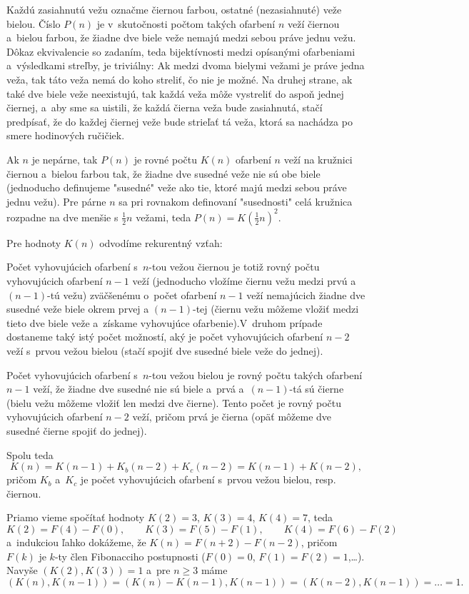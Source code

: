 {%
Každú zasiahnutú vežu označme čiernou farbou, ostatné (nezasiahnuté) veže bielou. Číslo $P(n)$
je v~skutočnosti počtom takých ofarbení $n$ veží čiernou a~bielou farbou, že žiadne dve biele veže nemajú medzi sebou práve jednu vežu. Dôkaz ekvivalencie so zadaním, teda bijektívnosti medzi opísanými ofarbeniami a~výsledkami streľby, je triviálny: Ak medzi dvoma bielymi vežami je práve jedna veža, tak táto veža nemá do koho streliť, čo nie je možné. Na druhej strane, ak také dve biele veže neexistujú, tak každá veža môže vystreliť do aspoň jednej čiernej, a~aby sme sa uistili, že každá čierna veža bude zasiahnutá, stačí predpísať, že do každej čiernej veže bude strieľať tá veža, ktorá sa nachádza po smere hodinových ručičiek.

Ak $n$ je nepárne, tak $P(n)$ je rovné počtu $K(n)$ ofarbení $n$ veží na kružnici čiernou a~bielou farbou tak, že žiadne dve susedné veže nie sú obe biele (jednoducho definujeme "susedné" veže ako tie, ktoré majú medzi sebou práve jednu vežu). Pre párne $n$ sa pri rovnakom definovaní "susednosti" celá kružnica rozpadne na dve menšie s $\frac12n$ vežami, teda $P(n)=K(\frac12n)^2$.

Pre hodnoty $K(n)$ odvodíme rekurentný vzťah:

Počet vyhovujúcich ofarbení s~$n$-tou vežou čiernou je totiž rovný počtu vyhovujúcich ofarbení $n-1$ veží (jednoducho vložíme čiernu vežu medzi prvú a $(n-1)$-tú vežu) zväčšenému o~počet ofarbení $n-1$ veží nemajúcich žiadne dve susedné veže biele okrem prvej a $(n-1)$-tej (čiernu vežu môžeme vložiť medzi tieto dve biele veže a~získame vyhovujúce ofarbenie).V~druhom prípade dostaneme taký istý počet možností, aký je počet vyhovujúcich ofarbení $n-2$ veží s~prvou vežou bielou (stačí spojiť dve susedné biele veže do jednej).

Počet vyhovujúcich ofarbení s~$n$-tou vežou bielou je rovný počtu takých ofarbení $n-1$ veží, že žiadne dve susedné nie sú biele a~prvá a~$(n-1)$-tá sú čierne (bielu vežu môžeme vložiť len medzi dve čierne). Tento počet je rovný počtu vyhovujúcich ofarbení  $n-2$ veží, pričom prvá je čierna (opäť môžeme dve susedné čierne spojiť do jednej).

Spolu teda
$$
K(n)=K(n-1)+K_b(n-2)+K_c(n-2)=K(n-1)+K(n-2),
$$
pričom $K_b$ a~$K_c$ je počet vyhovujúcich ofarbení s~prvou vežou bielou, resp. čiernou.

Priamo vieme spočítať hodnoty
$K(2)=3$, $K(3)=4$, $K(4)=7$, teda
$$
K(2)=F(4)-F(0),\qquad K(3)=F(5)-F(1),\qquad K(4)=F(6)-F(2)
$$
a~indukciou ľahko dokážeme, že $K(n)=F(n+2)-F(n-2)$, pričom $F(k)$ je  $k$-ty člen Fibonacciho postupnosti ($F(0)=0$, $F(1)=F(2)=1$,\dots). Navyše $(K(2),K(3))=1$  a~pre $n\ge3$
máme
$$
(K(n),K(n-1))=(K(n)-K(n-1),K(n-1))=(K(n-2),K(n-1))=\dots=1.
$$

}
